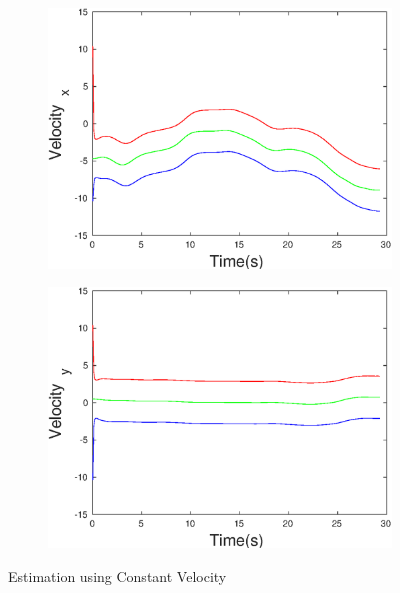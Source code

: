 \begin{figure}[h]
\begin{subfigure}{.5\linewidth}
\end{subfigure}
\begin{subfigure}{.5\linewidth}
\centering
\includegraphics[width=.9\linewidth]{figures/Frad/s3cvSMVelocity_x}
\end{subfigure}
\begin{subfigure}{.5\linewidth}
\centering
\includegraphics[width=.9\linewidth]{figures/Frad/s3cvSMVelocity_y}
\end{subfigure}
\caption{Estimation using Constant Velocity}
\end{figure}


